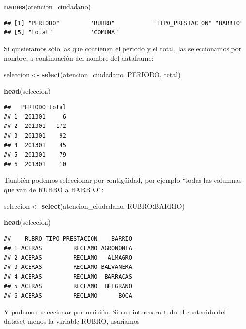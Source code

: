 \documentclass[spanish,]{book}
\newenvironment{Shaded}{\begin{snugshade}}{\end{snugshade}}
\newcommand{\KeywordTok}[1]{\textcolor[rgb]{0.13,0.29,0.53}{\textbf{#1}}}
\newcommand{\NormalTok}[1]{#1}
\newcommand{\OperatorTok}[1]{\textcolor[rgb]{0.81,0.36,0.00}{\textbf{#1}}}
\newcommand{\StringTok}[1]{\textcolor[rgb]{0.31,0.60,0.02}{#1}}
\begin{document}
\begin{Shaded}
\begin{Highlighting}[]
\KeywordTok{names}\NormalTok{(atencion_ciudadano)}
\end{Highlighting}
\end{Shaded}

\begin{verbatim}
## [1] "PERIODO"         "RUBRO"           "TIPO_PRESTACION" "BARRIO"         
## [5] "total"           "COMUNA"
\end{verbatim}

Si quisiéramos sólo las que contienen el período y el total, las seleccionamos por nombre, a continuación del nombre del dataframe:

\begin{Shaded}
\begin{Highlighting}[]
\NormalTok{seleccion <-}\StringTok{ }\KeywordTok{select}\NormalTok{(atencion_ciudadano, PERIODO, total)}

\KeywordTok{head}\NormalTok{(seleccion)}
\end{Highlighting}
\end{Shaded}

\begin{verbatim}
##   PERIODO total
## 1  201301     6
## 2  201301   172
## 3  201301    92
## 4  201301    45
## 5  201301    79
## 6  201301    10
\end{verbatim}

También podemos seleccionar por contigüidad, por ejemplo ``todas las columnas que van de RUBRO a BARRIO'':

\begin{Shaded}
\begin{Highlighting}[]
\NormalTok{seleccion <-}\StringTok{ }\KeywordTok{select}\NormalTok{(atencion_ciudadano, RUBRO}\OperatorTok{:}\NormalTok{BARRIO)}

\KeywordTok{head}\NormalTok{(seleccion)}
\end{Highlighting}
\end{Shaded}

\begin{verbatim}
##    RUBRO TIPO_PRESTACION    BARRIO
## 1 ACERAS         RECLAMO AGRONOMIA
## 2 ACERAS         RECLAMO   ALMAGRO
## 3 ACERAS         RECLAMO BALVANERA
## 4 ACERAS         RECLAMO  BARRACAS
## 5 ACERAS         RECLAMO  BELGRANO
## 6 ACERAS         RECLAMO      BOCA
\end{verbatim}

Y podemos seleccionar por omisión. Si nos interesara todo el contenido del dataset menos la variable RUBRO, usaríamos
\end{document}
